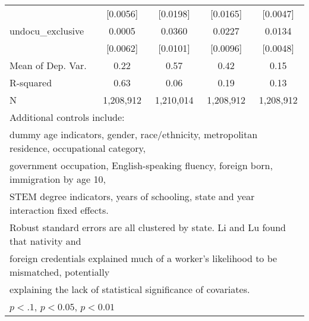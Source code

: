 \begin{table}[htbp]
\begin{tabular}{l*{4}{c}}
                    &    [0.0056]         &    [0.0198]         &    [0.0165]         &    [0.0047]         \\
\addlinespace
undocu\_exclusive    &      0.0005         &      0.0360\sym{***}&      0.0227\sym{**} &      0.0134\sym{***}\\
                    &    [0.0062]         &    [0.0101]         &    [0.0096]         &    [0.0048]         \\
\midrule
Mean of Dep. Var.   &        0.22         &        0.57         &        0.42         &        0.15         \\
R-squared           &        0.63         &        0.06         &        0.19         &        0.13         \\
N                   &   1,208,912         &   1,210,014         &   1,208,912         &   1,208,912         \\
\bottomrule
\multicolumn{5}{l}{\footnotesize Additional controls include:}\\
\multicolumn{5}{l}{\footnotesize dummy age indicators, gender, race/ethnicity, metropolitan residence, occupational category,}\\
\multicolumn{5}{l}{\footnotesize government occupation, English-speaking fluency, foreign born, immigration by age 10,}\\
\multicolumn{5}{l}{\footnotesize STEM degree indicators, years of schooling, state and year interaction fixed effects.}\\
\multicolumn{5}{l}{\footnotesize Robust standard errors are all clustered by state. Li and Lu found that nativity and}\\
\multicolumn{5}{l}{\footnotesize foreign credentials explained much of a worker's likelihood to be mismatched, potentially}\\
\multicolumn{5}{l}{\footnotesize explaining the lack of statistical significance of covariates.}\\
\multicolumn{5}{l}{\footnotesize \sym{*} \(p<.1\), \sym{**} \(p<0.05\), \sym{***} \(p<0.01\)}\\
\end{tabular}
\end{table}
